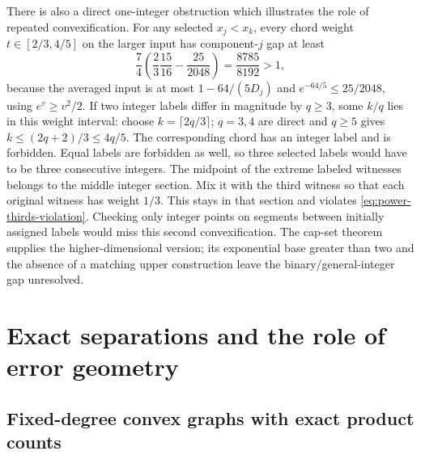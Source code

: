 There is also a direct one-integer obstruction which illustrates the role
of repeated convexification. For any selected $x_j<x_k$, every chord
weight $t\in[2/3,4/5]$ on the larger input has component-$j$ gap at least
\[
 \frac74\left(\frac23\frac{15}{16}-\frac{25}{2048}\right)
 =\frac{8785}{8192}>1,
\]
because the averaged input is at most $1-64/(5D_j)$ and
$e^{-64/5}\le25/2048$, using $e^v\ge v^2/2$.
If two integer labels differ in magnitude by $q\ge3$, some $k/q$
lies in this weight interval: choose $k=\lceil2q/3\rceil$;
$q=3,4$ are direct and $q\ge5$ gives
$k\le(2q+2)/3\le4q/5$. The corresponding chord has an integer
label and is forbidden. Equal labels are forbidden as well, so three
selected labels would have to be three consecutive integers. The midpoint
of the extreme labeled witnesses belongs to the middle integer section.
Mix it with the third witness so that each original witness has weight
$1/3$. This stays in that section and violates
\eqref{eq:power-thirds-violation}. Checking only integer points on
segments between initially assigned labels would miss this second
convexification. The cap-set theorem supplies the higher-dimensional
version; its exponential base greater than two and the absence of a
matching upper construction leave the binary/general-integer gap unresolved.

\section{Exact separations and the role of error geometry}
\label{sec:exact-separations}

\subsection{Fixed-degree convex graphs with exact product counts}


